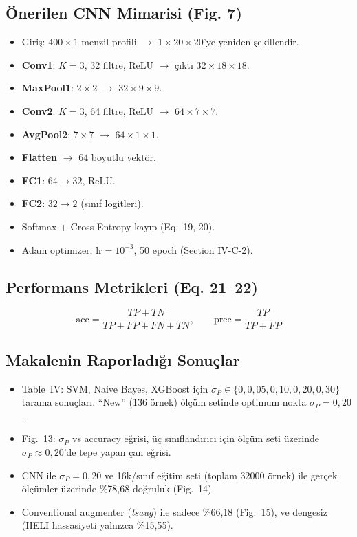 \documentclass[11pt,a4paper]{article}
\begin{document}
\subsection{Önerilen CNN Mimarisi (Fig. 7)}
\begin{itemize}
    \item Giriş: $400 \times 1$ menzil profili $\rightarrow$ $1 \times 20 \times 20$'ye yeniden şekillendir.
    \item \textbf{Conv1}: $K=3$, 32 filtre, ReLU $\rightarrow$ çıktı $32 \times 18 \times 18$.
    \item \textbf{MaxPool1}: $2 \times 2$ $\rightarrow$ $32 \times 9 \times 9$.
    \item \textbf{Conv2}: $K=3$, 64 filtre, ReLU $\rightarrow$ $64 \times 7 \times 7$.
    \item \textbf{AvgPool2}: $7 \times 7$ $\rightarrow$ $64 \times 1 \times 1$.
    \item \textbf{Flatten} $\rightarrow$ $64$ boyutlu vektör.
    \item \textbf{FC1}: $64 \rightarrow 32$, ReLU.
    \item \textbf{FC2}: $32 \rightarrow 2$ (sınıf logitleri).
    \item Softmax + Cross-Entropy kayıp (Eq.~19, 20).
    \item Adam optimizer, $\text{lr} = 10^{-3}$, 50 epoch (Section IV-C-2).
\end{itemize}

\subsection{Performans Metrikleri (Eq. 21--22)}
\begin{equation}
\text{acc} = \frac{TP + TN}{TP + FP + FN + TN}, \qquad
\text{prec} = \frac{TP}{TP + FP}
\end{equation}

\subsection{Makalenin Raporladığı Sonuçlar}
\begin{itemize}
    \item Table~IV: SVM, Naive Bayes, XGBoost için $\sigma_P \in \{0, 0{,}05, 0{,}10, 0{,}20, 0{,}30\}$ tarama sonuçları.
          ``New'' (136 örnek) ölçüm setinde optimum nokta $\sigma_P = 0{,}20$.
    \item Fig.~13: $\sigma_P$ vs accuracy eğrisi, üç sınıflandırıcı için ölçüm seti üzerinde
          $\sigma_P \approx 0{,}20$'de tepe yapan çan eğrisi.
    \item CNN ile $\sigma_P=0{,}20$ ve 16k/sınıf eğitim seti (toplam 32000 örnek) ile gerçek
          ölçümler üzerinde \%78{,}68 doğruluk (Fig.~14).
    \item Conventional augmenter (\emph{tsaug}) ile sadece \%66{,}18 (Fig.~15), ve dengesiz
          (HELI hassasiyeti yalnızca \%15{,}55).
\end{itemize}
\end{document}
